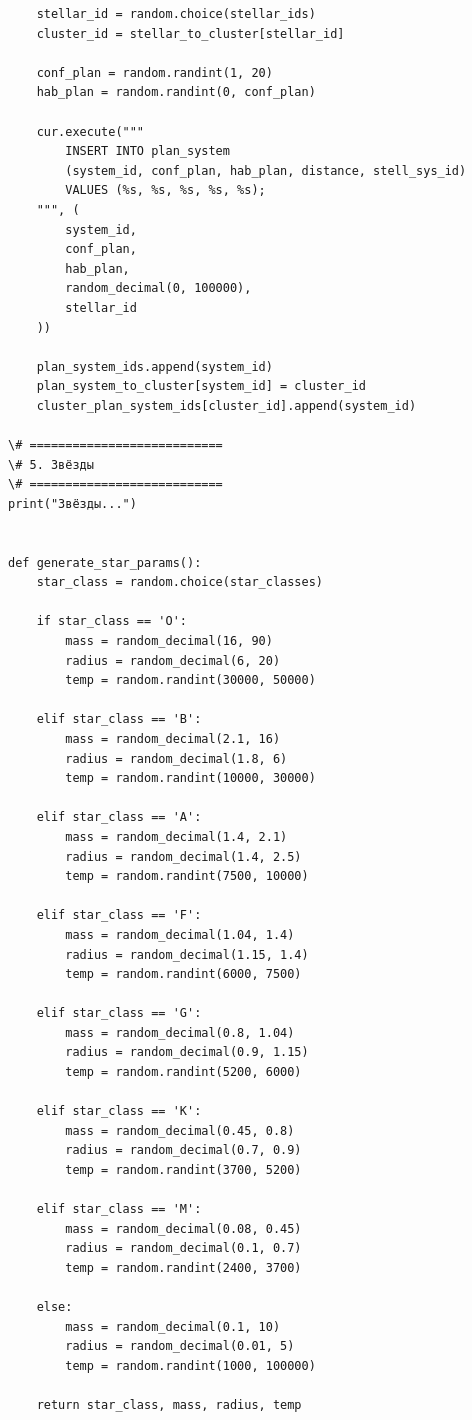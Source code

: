 \documentclass[14pt,a4paper]{extarticle}
\begin{document}
\begin{lstlisting}
    stellar_id = random.choice(stellar_ids)
    cluster_id = stellar_to_cluster[stellar_id]

    conf_plan = random.randint(1, 20)
    hab_plan = random.randint(0, conf_plan)

    cur.execute("""
        INSERT INTO plan_system
        (system_id, conf_plan, hab_plan, distance, stell_sys_id)
        VALUES (%s, %s, %s, %s, %s);
    """, (
        system_id,
        conf_plan,
        hab_plan,
        random_decimal(0, 100000),
        stellar_id
    ))

    plan_system_ids.append(system_id)
    plan_system_to_cluster[system_id] = cluster_id
    cluster_plan_system_ids[cluster_id].append(system_id)

\# ===========================
\# 5. Звёзды
\# ===========================
print("Звёзды...")


def generate_star_params():
    star_class = random.choice(star_classes)

    if star_class == 'O':
        mass = random_decimal(16, 90)
        radius = random_decimal(6, 20)
        temp = random.randint(30000, 50000)

    elif star_class == 'B':
        mass = random_decimal(2.1, 16)
        radius = random_decimal(1.8, 6)
        temp = random.randint(10000, 30000)

    elif star_class == 'A':
        mass = random_decimal(1.4, 2.1)
        radius = random_decimal(1.4, 2.5)
        temp = random.randint(7500, 10000)

    elif star_class == 'F':
        mass = random_decimal(1.04, 1.4)
        radius = random_decimal(1.15, 1.4)
        temp = random.randint(6000, 7500)

    elif star_class == 'G':
        mass = random_decimal(0.8, 1.04)
        radius = random_decimal(0.9, 1.15)
        temp = random.randint(5200, 6000)

    elif star_class == 'K':
        mass = random_decimal(0.45, 0.8)
        radius = random_decimal(0.7, 0.9)
        temp = random.randint(3700, 5200)

    elif star_class == 'M':
        mass = random_decimal(0.08, 0.45)
        radius = random_decimal(0.1, 0.7)
        temp = random.randint(2400, 3700)

    else:
        mass = random_decimal(0.1, 10)
        radius = random_decimal(0.01, 5)
        temp = random.randint(1000, 100000)

    return star_class, mass, radius, temp



\end{lstlisting}
\end{document}
